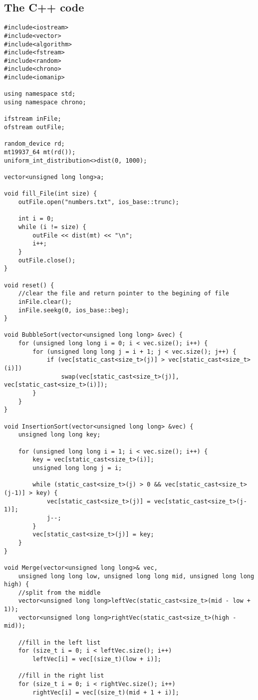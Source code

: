 \documentclass[a4paper, 12pt]{article}
\begin{document}
	\subsection*{The C++ code}
	\begin{lstlisting}
#include<iostream>
#include<vector>
#include<algorithm>
#include<fstream>
#include<random>
#include<chrono>
#include<iomanip>

using namespace std;
using namespace chrono;

ifstream inFile;
ofstream outFile;

random_device rd;
mt19937_64 mt(rd());
uniform_int_distribution<>dist(0, 1000);

vector<unsigned long long>a;

void fill_File(int size) {
	outFile.open("numbers.txt", ios_base::trunc);

	int i = 0;
	while (i != size) {
		outFile << dist(mt) << "\n";
		i++;
	}
	outFile.close();
}

void reset() {
	//clear the file and return pointer to the begining of file
	inFile.clear();
	inFile.seekg(0, ios_base::beg);
}

void BubbleSort(vector<unsigned long long> &vec) {
	for (unsigned long long i = 0; i < vec.size(); i++) {
		for (unsigned long long j = i + 1; j < vec.size(); j++) {
			if (vec[static_cast<size_t>(j)] > vec[static_cast<size_t>(i)])
				swap(vec[static_cast<size_t>(j)], vec[static_cast<size_t>(i)]);
		}
	}
}

void InsertionSort(vector<unsigned long long> &vec) {
	unsigned long long key;
	
	for (unsigned long long i = 1; i < vec.size(); i++) {
		key = vec[static_cast<size_t>(i)];
		unsigned long long j = i;

		while (static_cast<size_t>(j) > 0 && vec[static_cast<size_t>(j-1)] > key) {
			vec[static_cast<size_t>(j)] = vec[static_cast<size_t>(j-1)];
			j--;
		}
		vec[static_cast<size_t>(j)] = key;
	}
}

void Merge(vector<unsigned long long>& vec, 
	unsigned long long low, unsigned long long mid, unsigned long long high) {
	//split from the middle
	vector<unsigned long long>leftVec(static_cast<size_t>(mid - low + 1));
	vector<unsigned long long>rightVec(static_cast<size_t>(high - mid));

	//fill in the left list
	for (size_t i = 0; i < leftVec.size(); i++)
		leftVec[i] = vec[(size_t)(low + i)];

	//fill in the right list
	for (size_t i = 0; i < rightVec.size(); i++)
		rightVec[i] = vec[(size_t)(mid + 1 + i)];


\end{lstlisting}
\end{document}

